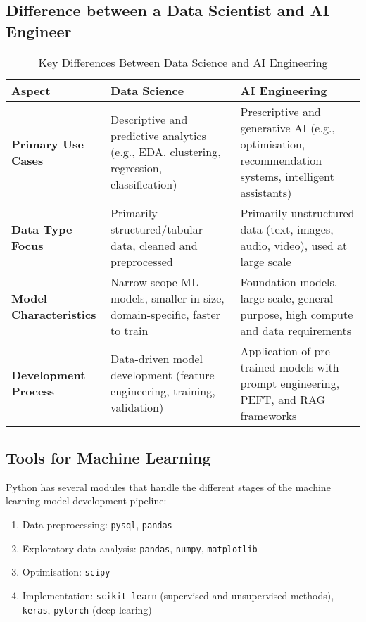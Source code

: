 \documentclass[9pt]{extarticle}
\begin{document}
\subsection{Difference between a Data Scientist and AI Engineer} 

\begin{table}[h!]
\centering
\begin{tabular}{|p{3.5cm}|p{5cm}|p{5cm}|}
\hline
\textbf{Aspect} & \textbf{Data Science} & \textbf{AI Engineering} \\
\hline
\textbf{Primary Use Cases} & Descriptive and predictive analytics (e.g., EDA, clustering, regression, classification) & Prescriptive and generative AI (e.g., optimisation, recommendation systems, intelligent assistants) \\
\hline
\textbf{Data Type Focus} & Primarily structured/tabular data, cleaned and preprocessed & Primarily unstructured data (text, images, audio, video), used at large scale \\
\hline
\textbf{Model Characteristics} & Narrow-scope ML models, smaller in size, domain-specific, faster to train & Foundation models, large-scale, general-purpose, high compute and data requirements \\
\hline
\textbf{Development Process} & Data-driven model development (feature engineering, training, validation) & Application of pre-trained models with prompt engineering, PEFT, and RAG frameworks \\
\hline
\end{tabular}
\caption{Key Differences Between Data Science and AI Engineering}
\end{table}


\subsection{Tools for Machine Learning}

Python has several modules that handle the different stages of the 
machine learning model development pipeline:
\begin{enumerate}
    \item Data preprocessing: \texttt{pysql}, \texttt{pandas}
    \item Exploratory data analysis: \texttt{pandas}, \texttt{numpy}, \texttt{matplotlib}
    \item Optimisation: \texttt{scipy}
    \item Implementation: \texttt{scikit-learn} (supervised and unsupervised methods), 
    \texttt{keras}, \texttt{pytorch} (deep learing)
\end{enumerate}
\end{document}
